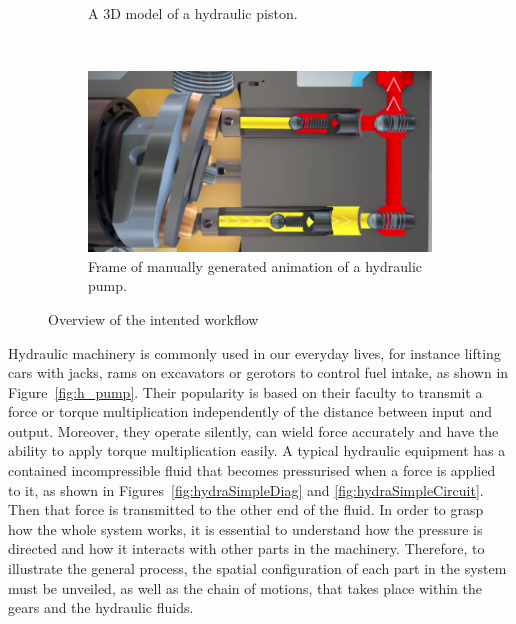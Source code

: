 \begin{figure}[htbp]
\begin{subfigure}[b]{0.3\textwidth}
                \caption{A 3D model of a hydraulic piston.}
                \label{fig:pistonModel}
        \end{subfigure}
        ~ %
        \begin{subfigure}[b]{0.3\textwidth}
                \includegraphics[width=\textwidth]{images/cylinder_animation}
                \caption{Frame of manually generated animation of a hydraulic pump.}
                \label{fig:cylinder_animation}
        \end{subfigure}
        \caption{Overview of the intented workflow}\label{fig:AnimOverview}
\end{figure}

Hydraulic machinery is commonly used in our everyday lives, for instance lifting cars with jacks, rams on excavators or gerotors to control fuel intake, as shown in Figure~\ref{fig:h_pump}.
Their popularity is based on their faculty to transmit a force or torque multiplication independently of the distance between input and output.
Moreover, they operate silently, can wield force accurately and have the ability to apply torque multiplication easily.
A typical hydraulic equipment has a contained incompressible fluid that becomes pressurised when a force is applied to it, as shown in Figures~\ref{fig:hydraSimpleDiag} and \ref{fig:hydraSimpleCircuit}.
Then that force is transmitted to the other end of the fluid.
In order to grasp how the whole system works, it is essential to understand how the pressure is directed and how it interacts with other parts in the machinery. 
Therefore, to illustrate the general process, the spatial configuration of each part in the system must be unveiled, as well as the chain of motions, that takes place within the gears and the hydraulic fluids.


